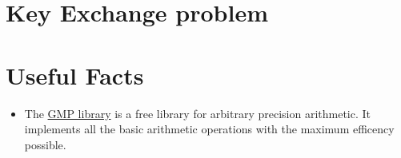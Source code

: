 \documentclass[12pt, a4paper, english]{report}
\begin{document}
\chapter{Key Exchange problem}


\chapter*{Useful Facts}
\begin{itemize}
    \item The \href{https://gmplib.org/}{GMP library} is a free library for arbitrary precision arithmetic. It implements all the basic arithmetic operations with the maximum efficency possible.
\end{itemize}

\listofalgorithms
\listoftheorems[ignoreall, show={theorem}]

\begingroup               %
  \let\clearpage\relax    %
  \renewcommand{\listtheoremname}{List of Lemmas}
  \listoftheorems[ignoreall, show={lemma}]
\endgroup
\end{document}
